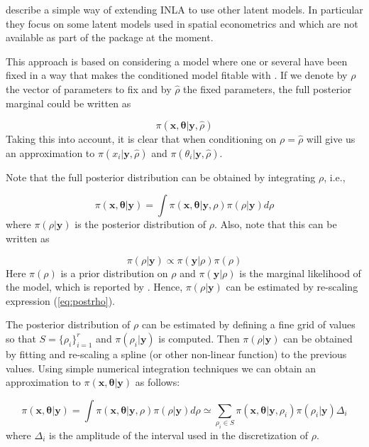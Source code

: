 \documentclass[article]{jss}
\begin{document}
\citet{Bivandetal:2013} describe a simple way of extending INLA to use other
latent models.  In particular they focus on some latent models used in spatial
econometrics and which are not available as part of the  package at
the moment.

This approach is based on considering a model where one or several have been
fixed in a way that makes the conditioned model fitable with .  If
we denote by $\rho$ the vector of parameters to fix and by $\hat{\rho}$ the
fixed parameters,  the full posterior marginal could be written as


$$
\pi(\mathbf{x}, \mathbf{\theta}|\mathbf{y}, \hat{\rho}) 
$$
\noindent
Taking this into account,  it is clear that when conditioning on
$\rho=\hat\rho$  will give us an approximation to
$\pi(x_i|\mathbf{y}, \hat{\rho})$ and $\pi(\theta_i|\mathbf{y}, \hat{\rho})$.



Note that the full posterior distribution can be obtained by integrating $\rho$,
i.e.,

\begin{equation}
\pi(\mathbf{x}, \mathbf{\theta}|\mathbf{y}) = 
\int \pi(\mathbf{x}, \mathbf{\theta}|\mathbf{y}, \rho)\pi(\rho|\mathbf{y})d\rho
\label{eq:fullpost}
\end{equation}
\noindent
where $\pi(\rho|\mathbf{y})$ is the posterior distribution of $\rho$. Also,
note that this can be written as

\begin{equation}
\pi(\rho|\mathbf{y}) \propto \pi(\mathbf{y}|\rho) \pi(\rho)
\label{eq:postrho}
\end{equation}
\noindent
Here $\pi(\rho)$ is a prior distribution on $\rho$ and $\pi(\mathbf{y}|\rho)$
is the marginal likelihood of the model, which is reported by .
Hence, $\pi(\rho|\mathbf{y})$ can be estimated by re-scaling expression 
(\ref{eq:postrho}).


The posterior distribution of $\rho$ can be estimated by defining a fine grid
of values so that $S=\{\rho_i\}_{i=1}^r$ and $\pi(\rho_i|\mathbf{y})$ is
computed.  Then $\pi(\rho|\mathbf{y})$ can be obtained by fitting and
re-scaling a spline (or other non-linear function) to the previous values.
Using simple numerical integration techniques we can obtain an approximation to
$\pi(\mathbf{x}, \mathbf{\theta}|\mathbf{y})$ as follows:

\begin{equation}
\pi(\mathbf{x}, \mathbf{\theta}|\mathbf{y}) = \int \pi(\mathbf{x}, \mathbf{\theta}|\mathbf{y}, \rho)\pi(\rho|\mathbf{y})d\rho
\simeq
\sum_{\rho_i\in S}\pi(\mathbf{x}, \mathbf{\theta}|\mathbf{y}, \rho_i)  
\pi(\rho_i|\mathbf{y}) \Delta_i
\label{eq:fullpostapp}
\end{equation}
\noindent
where $\Delta_i$ is the amplitude of the interval used in the discretization
of $\rho$.
\end{document}
